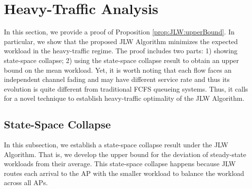 \documentclass[10pt, conference, letterpaper]{IEEEtran} %
\begin{document}
%
%



\section{Heavy-Traffic Analysis}
\label{sec:heavy-traffic}

In this section, we provide a proof of Proposition \ref{prop:JLW:upperBound}. In particular, we show that the proposed JLW Algorithm minimizes the expected workload in the heavy-traffic regime. The proof includes two parts: 1) showing state-space collapse; 2) using the state-space collapse result to obtain an upper bound on the mean workload. Yet, it is worth noting that each flow faces an independent channel fading and may have different service rate and thus its evolution is quite different from traditional FCFS queueing systems. Thus, it calls for a novel technique to establish heavy-traffic optimality of the JLW Algorithm. 

\subsection{State-Space Collapse}

In this subsection, we establish a state-space collapse result under the JLW Algorithm. That is, we develop the upper bound for the deviation of steady-state workloads from their average. This state-space collapse happens because JLW routes each arrival to the AP with the smaller workload to balance the workload across all APs. 
\end{document}
